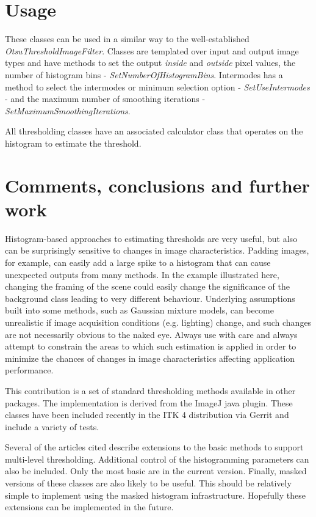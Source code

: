 \documentclass{InsightArticle}
\begin{document}
\section{Usage}
These classes can be used in a similar way to the well-established
{\em OtsuThresholdImageFilter}. Classes are templated over input and
output image types and have methods to set the output {\em inside} and
{\em outside} pixel values, the number of histogram bins - {\em
  SetNumberOfHistogramBins}. Intermodes has a method to select the
intermodes or minimum selection option - {\em SetUseIntermodes} - and
the maximum number of smoothing iterations - {\em
  SetMaximumSmoothingIterations}.

All thresholding classes have an associated calculator class that
operates on the histogram to estimate the threshold. 

\section{Comments, conclusions and further work}
Histogram-based approaches to estimating thresholds are very useful, but also can be surprisingly sensitive to changes in image characteristics. Padding images, for example, can easily add a large spike to a histogram that can cause unexpected outputs from many methods. In the example illustrated here, changing the framing of the scene could easily change the significance of the background class leading to very different behaviour. Underlying assumptions built into some methods, such as Gaussian mixture models, can become unrealistic if image acquisition conditions (e.g. lighting) change, and such changes are not necessarily obvious to the naked eye. Always use with care and always attempt to constrain the areas to which such estimation is applied in order to minimize the chances of changes in image characteristics affecting application performance.

This contribution is a set of standard thresholding methods available in other packages. The implementation is derived from the ImageJ java plugin. These classes have been included recently in the ITK 4 distribution via Gerrit and include a variety of tests.

Several of the articles cited describe extensions to the basic methods to support multi-level thresholding. Additional control of the histogramming parameters can also be included. Only the most basic are in the current version. Finally, masked versions of these classes are also likely to be useful. This should be relatively simple to implement using the masked histogram infrastructure. Hopefully these extensions can be implemented in the future.

\appendix





\nocite{ITKSoftwareGuide}
\end{document}
